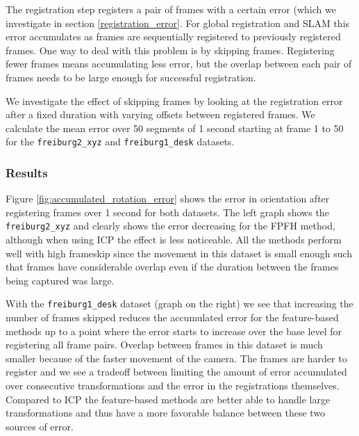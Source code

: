 \documentclass[a4paper]{article}
\begin{document}
The registration step registers a pair of frames with a certain error (which we investigate in section \ref{registration_error}. For global registration and \ac{SLAM} this error accumulates as frames are sequentially registered to previously registered frames. One way to deal with this problem is by skipping frames. Registering fewer frames means accumulating less error, but the overlap between each pair of frames needs to be large enough for successful registration. 

We investigate the effect of skipping frames by looking at the registration error after a fixed duration with varying offsets between registered frames. We calculate the mean error over 50 segments of 1 second starting at frame 1 to 50 for the \texttt{freiburg2\_xyz} and \texttt{freiburg1\_desk} datasets.

\subsubsection{Results}

Figure \ref{fig:accumulated_rotation_error} shows the error in orientation after registering frames over 1 second for both datasets. The left graph shows the \texttt{freiburg2\_xyz} and clearly shows the error decreasing for the \ac{FPFH} method, although when using \ac{ICP} the effect is less noticeable. All the methods perform well with high frameskip since the movement in this dataset is small enough such that frames have considerable overlap even if the duration between the frames being captured was large.

With the \texttt{freiburg1\_desk} dataset (graph on the right) we see that increasing the number of frames skipped reduces the accumulated error for the feature-based methods up to a point where the error starts to increase over the base level for registering all frame pairs. Overlap between frames in this dataset is much smaller because of the faster movement of the camera. The frames are harder to register and we see a tradeoff between limiting the amount of error accumulated over consecutive transformations and the error in the registrations themselves. Compared to \ac{ICP} the feature-based methods are better able to handle large transformations and thus have a more favorable balance between these two sources of error.
\end{document}
